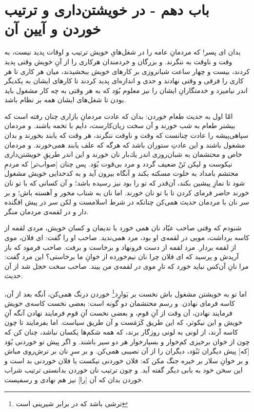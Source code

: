 \section*{باب دهم - در خویشتن‌داری و ترتیب خوردن و آیین آن}

بدان ای  پسر! كه مردمانِ عامه را در شغل‌هاىِ خويش ترتيب و اوقات پديد نيست، به وقت و ناوقت به ننگرند. و بزرگان و خردمندان هركارى را از آنِ خويش وقتى پديد كردند، بيست و چهار ساعت شبانروزى بر كارهاى خويش ببخشيدند، ميان هر كارى تا هر كارى را فرقى و وقتى نهادند و حدى و اندازه‌اى پديد كردند تا كارهاى ايشان به يكديگر اندر نياميزد و خدمتگارانِ ايشان را نيز معلوم بُوَد كه به هر وقتى به چه كار مشغول بايد بودن تا شغل‌هاى ايشان همه بر نظام باشد.

امّا اول به حديث طعام خوردن: بدان كه عادت مردمانِ بازارى چنان رفته است كه بيشتر طعام به شب خورند و آن سخت زيان‌كارست، دايم با تخمه باشند. و مردمان سپاهی‌پيشه را عادت چنانست كه وقت و ناوقت ننگرند، هر وقت كه يابند بخورند و بدان مشغول باشند و اين عادتِ ستوران باشد كه هرگه كه علف يابند همى‌خورند. و مردمان خاص و محتشمان به شبان‌روزى اندر يك‌بار نان خورند و اين اندر طريقِ خويشتن‌دارى نيكوست و ليكن تَنْ ضعيف گردد و مرد بى‌قوت بُوَد. پس چنان [صواب‌تر] كه مردمِ محتشم بامداد به خلوت مسكنه بكند و آنگاه بيرون آيد و به كدخدايى خويش مشغول شود تا نمازِ پيشين بكند، آن‌قدر كه تو را بود نيز رسيده باشد؛ و آن كسانى كه با تو نان خورند حاضر فرماى كردن تا با تو نان خورند. اما نان به شتاب مخور و آهسته باش؛ و بر سر نان با مردمان حديث همى‌كن چنانكه در شرط اسلامست و لكن سر در پيش افگنده دار و در لقمه‌ی مردمان منگر.

شنودم كه وقتى صاحب عبّاد نان همى خورد با نديمان و كسان خويش، مردى لقمه از كاسه برداشت، مويى در لقمه‌ی او بود، مرد همى‌نديد. صاحب او را گفت: اى فلان، موى از لقمه بردار. مرد لقمه از دست فرونهاد و برخاست و برفت. صاحب فرمود كه باز آريدش و پرسيد كه اى فلان چرا نان نيم‌خورده از خوانِ ما برخاستى‌؟ اين مرد گفت: مرا نانِ آن‌كس نبايد خورد كه تارِ موى در لقمه‌ی من بيند. صاحب سخت خجل شد از آن حديث.

اما تو به خويشتن مشغول باش نخست بر بَوارِد\footnote{ترشی باشد که در برابر شیرینی است} خوردن درنگ همى‌كن، آنگه بعد از آن، كاسه فرماى نهادن. و رسم محتشمان دو گونه است: بعضى نخست كاسه‌ی خويش فرمايند نهادن، آن وقت از آنِ قوم، و بعضى نخست آنِ قوم فرمايند نهادن آنگه آنِ خويش و اين نيكوتر، كه اين طريق كَرَمَست و آن طريق سياست. اما بفرمايند تا چون كاسه آرند، از لونى به لونى روزگار برند، كه همه شكم‌ها يكسان نباشد، چنان كن كه چون از خوان برخيزى كم‌خوار و بسيارخوار هر دو سير باشند. و اگر پيش تو خوردنى بُوَد [كه] پيش ديگران نَبُوَد، ديگران را از آن نصيبى همى‌كن. و بر سرِ نان بر ترش‌روى مباش و بر خوانِ سلار بر خيره جنگ مكن كه: فلان خوردنى نيكست يا فلان خوردنى بد است و اين سخن خود به بابى ديگر گفته آيد. و چون ترتيب نان خوردن بدانستى ترتيب شراب خوردن بدان كه آن [را] نيز هم نهادى و رسميست.


\newpage

